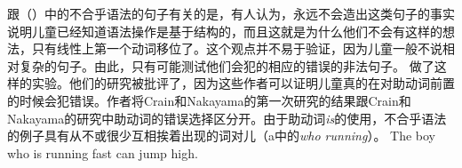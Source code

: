 
跟（）中的不合乎语法的句子有关的是，有人认为，永远不会造出这类句子的事实说明儿童已经知道语法操作是基于结构的，而且这就是为什么他们不会有这样的想法，只有线性上第一个动词移位了\citep{CN87a-u}。这个观点并不易于验证，因为儿童一般不说相对复杂的句子。由此，只有可能测试他们会犯的相应的错误的非法句子。
\citet{CN87a-u}做了这样的实验。他们的研究被\citet*{ARP2008a}批评了，因为这些作者可以证明儿童真的在对助动词前置的时候会犯错误。作者将Crain和Nakayama的第一次研究的结果跟Crain和Nakayama的研究中助动词的错误选择区分开。由于助动词\emph{is}的使用，不合乎语法的例子具有从不或很少互相挨着出现的词对儿（a中的\emph{who running}）。
\eal
\ex 
\gll {} The boy who is running fast can jump high. \\
